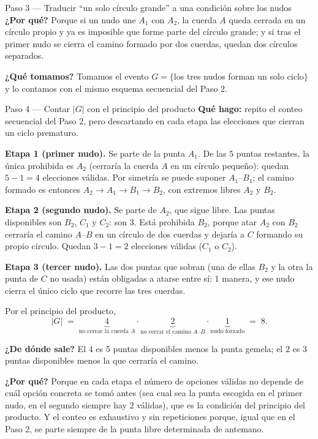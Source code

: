\documentclass[11pt]{article}
\begin{document}
\begin{sol}
\begin{paso}{Paso 3 --- Traducir ``un solo c\'irculo grande'' a una condici\'on sobre los nudos}
\textbf{¿Por qu\'e?} Porque si un nudo une $A_1$ con $A_2$, la cuerda $A$ queda cerrada en un c\'irculo propio y ya es imposible que forme parte del c\'irculo grande; y si tras el primer nudo se cierra el camino formado por dos cuerdas, quedan dos c\'irculos separados.

\textbf{¿Qu\'e tomamos?} Tomamos el evento $G=\{$los tres nudos forman un solo ciclo$\}$ y lo contamos con el mismo esquema secuencial del Paso 2.
\end{paso}

\begin{paso}{Paso 4 --- Contar $|G|$ con el principio del producto}
\textbf{Qu\'e hago:} repito el conteo secuencial del Paso 2, pero descartando en cada etapa las elecciones que cierran un ciclo prematuro.

\textbf{Etapa 1 (primer nudo).} Se parte de la punta $A_1$. De las $5$ puntas restantes, la \'unica prohibida es $A_2$ (cerrar\'ia la cuerda $A$ en un c\'irculo peque\~no): quedan $5-1=4$ elecciones v\'alidas. Por simetr\'ia se puede suponer $A_1$--$B_1$; el camino formado es entonces $A_2 \to A_1 \to B_1 \to B_2$, con extremos libres $A_2$ y $B_2$.

\textbf{Etapa 2 (segundo nudo).} Se parte de $A_2$, que sigue libre. Las puntas disponibles son $B_2$, $C_1$ y $C_2$: son $3$. Est\'a prohibida $B_2$, porque atar $A_2$ con $B_2$ cerrar\'ia el camino $A$--$B$ en un c\'irculo de dos cuerdas y dejar\'ia a $C$ formando su propio c\'irculo. Quedan $3-1=2$ elecciones v\'alidas ($C_1$ o $C_2$).

\textbf{Etapa 3 (tercer nudo).} Las dos puntas que sobran (una de ellas $B_2$ y la otra la punta de $C$ no usada) est\'an obligadas a atarse entre s\'i: $1$ manera, y ese nudo cierra el \'unico ciclo que recorre las tres cuerdas.

Por el principio del producto,
\[
|G| \;=\; \underbrace{4}_{\text{no cerrar la cuerda }A}\cdot\underbrace{2}_{\text{no cerrar el camino }A\text{--}B}\cdot\underbrace{1}_{\text{nudo forzado}} \;=\; 8 .
\]

\textbf{¿De d\'onde sale?} El $4$ es $5$ puntas disponibles menos la punta gemela; el $2$ es $3$ puntas disponibles menos la que cerrar\'ia el camino.

\textbf{¿Por qu\'e?} Porque en cada etapa el n\'umero de opciones v\'alidas no depende de cu\'al opci\'on concreta se tom\'o antes (sea cual sea la punta escogida en el primer nudo, en el segundo siempre hay $2$ v\'alidas), que es la condici\'on del principio del producto. Y el conteo es exhaustivo y sin repeticiones porque, igual que en el Paso 2, se parte siempre de la punta libre determinada de antemano.


\end{paso}
\end{sol}
\end{document}
